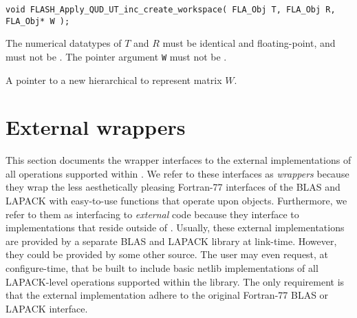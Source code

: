 
\begin{flaspec}
\begin{verbatim}
void FLASH_Apply_QUD_UT_inc_create_workspace( FLA_Obj T, FLA_Obj R, FLA_Obj* W );
\end{verbatim}
\begin{checks}
\checkitem
The numerical datatypes of $ T $ and $ R $ must be identical and
floating-point, and must not be \flaconstantns.
\itemvsp
\checkitem
The pointer argument {\tt W} must not be \fnullns.
\end{checks}
\begin{params}
                       {A pointer to a new hierarchical \flaobj to represent matrix $ W $.}
\end{params}
\end{flaspec}











\section{External wrappers}

This section documents the wrapper interfaces to the external implementations
of all operations supported within \libflamens.
We refer to these interfaces as {\em wrappers} because they wrap
the less aesthetically pleasing Fortran-77 interfaces of the BLAS and LAPACK
with easy-to-use functions that operate upon \libflame objects.
Furthermore, we refer to them as interfacing to {\em external} code because
they interface to implementations that reside outside of \libflamens.
Usually, these external implementations are provided by a separate BLAS and
LAPACK library at link-time.
However, they could be provided by some other source.
The user may even request, at configure-time, that \libflame be built to include
basic netlib implementations of all LAPACK-level operations supported within
the library.
The only requirement is that the external implementation adhere to the original
Fortran-77 BLAS or LAPACK interface.




